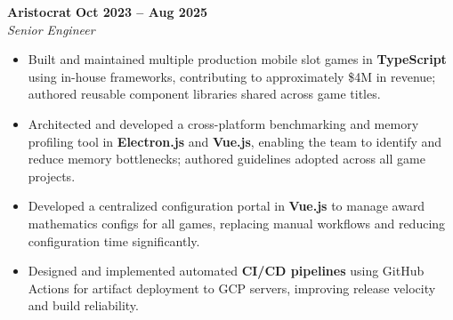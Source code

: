 \documentclass[a4paper,10pt]{article}
\begin{document}
\noindent
\textbf{Aristocrat} \hfill \textbf{Oct 2023 -- Aug 2025} \\
\textit{Senior Engineer}
\begin{itemize}[leftmargin=*,itemsep=2pt,parsep=0pt]
    \item Built and maintained multiple production mobile slot games in \textbf{TypeScript} using in-house frameworks, contributing to approximately \$4M in revenue; authored reusable component libraries shared across game titles.
    \item Architected and developed a cross-platform benchmarking and memory profiling tool in \textbf{Electron.js} and \textbf{Vue.js}, enabling the team to identify and reduce memory bottlenecks; authored guidelines adopted across all game projects.
    \item Developed a centralized configuration portal in \textbf{Vue.js} to manage award mathematics configs for all games, replacing manual workflows and reducing configuration time significantly.
    \item Designed and implemented automated \textbf{CI/CD pipelines} using GitHub Actions for artifact deployment to GCP servers, improving release velocity and build reliability.
\end{itemize}
\end{document}
